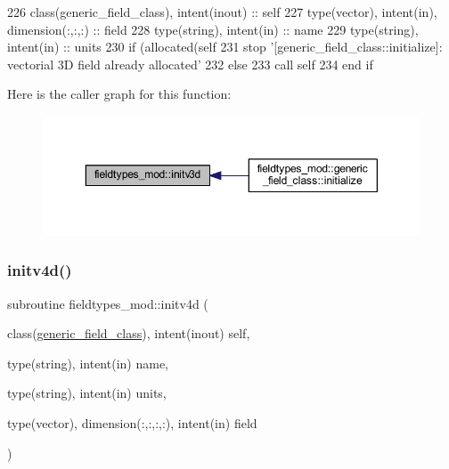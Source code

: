 \begin{DoxyCode}
226     \textcolor{keywordtype}{class}(generic\_field\_class), \textcolor{keywordtype}{intent(inout)} :: self
227     \textcolor{keywordtype}{type}(vector), \textcolor{keywordtype}{intent(in)}, \textcolor{keywordtype}{dimension(:,:,:)} :: field
228     \textcolor{keywordtype}{type}(string), \textcolor{keywordtype}{intent(in)} :: name
229     \textcolor{keywordtype}{type}(string), \textcolor{keywordtype}{intent(in)} :: units
230     \textcolor{keywordflow}{if} (\textcolor{keyword}{allocated}(self%
231         stop \textcolor{stringliteral}{'[generic\_field\_class::initialize]: vectorial 3D field already allocated'}
232     \textcolor{keywordflow}{else}
233         \textcolor{keyword}{call }self%
234 \textcolor{keywordflow}{    end if}
\end{DoxyCode}
Here is the caller graph for this function\+:\nopagebreak
\begin{figure}[H]
\begin{center}
\leavevmode
\includegraphics[width=350pt]{namespacefieldtypes__mod_aa0a152c9e5131d3003cc34e4f3b2974d_icgraph}
\end{center}
\end{figure}
\mbox{\label{namespacefieldtypes__mod_a08d665678bea0956a323d08863e164e5}} 
\subsubsection{\texorpdfstring{initv4d()}{initv4d()}}
{\footnotesize\ttfamily subroutine fieldtypes\+\_\+mod\+::initv4d (\begin{DoxyParamCaption}\item[{class(\mbox{\hyperlink{structfieldtypes__mod_1_1generic__field__class}{generic\+\_\+field\+\_\+class}}), intent(inout)}]{self,  }\item[{type(string), intent(in)}]{name,  }\item[{type(string), intent(in)}]{units,  }\item[{type(vector), dimension(\+:,\+:,\+:,\+:), intent(in)}]{field }\end{DoxyParamCaption})\hspace{0.3cm}{\ttfamily [private]}}



